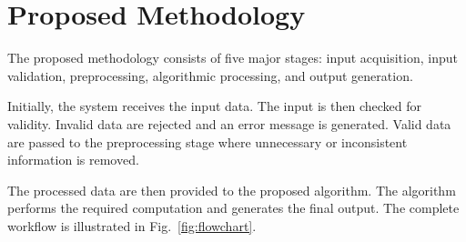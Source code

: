 \documentclass[conference]{IEEEtran}
\begin{document}

\section{Proposed Methodology}

The proposed methodology consists of five major stages:
input acquisition, input validation, preprocessing,
algorithmic processing, and output generation.

Initially, the system receives the input data. The input is
then checked for validity. Invalid data are rejected and an
error message is generated. Valid data are passed to the
preprocessing stage where unnecessary or inconsistent
information is removed.

The processed data are then provided to the proposed
algorithm. The algorithm performs the required computation
and generates the final output. The complete workflow is
illustrated in Fig.~\ref{fig:flowchart}.

\end{document}
